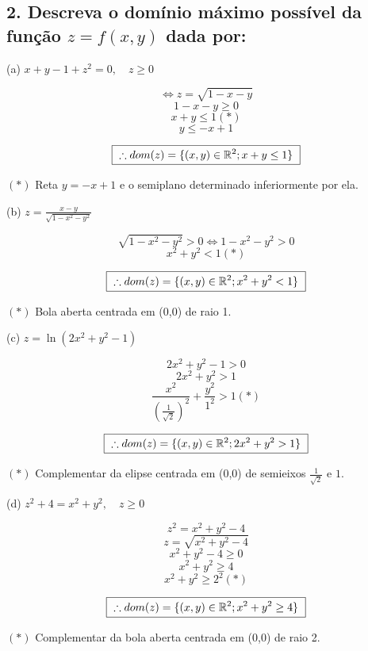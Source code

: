 \documentclass{article}
\newcommand{\n}{\phantom{}}
\renewcommand{\d}[1]{\displaystyle{#1}}
\begin{document}
    \subsection*{2. Descreva o domínio máximo possível da função $z = f(x, y)$ dada por:}
        \hspace*{12px}
        (a) $\d{ x + y - 1 + z^2 = 0, \quad z \geq 0 }$

        \[\Leftrightarrow z = \sqrt{1 - x - y}\]
        \[1 - x - y \geq 0\]
        \[x + y \leq 1 (*)\]
        \[y \leq -x + 1\]

        \[\fbox{ $\d{ \therefore dom(z) = \{(x,y) \in \mathbb{R}^2; x + y \leq 1\} }$ }\]

        $(*)$ Reta $y = -x + 1$ e o semiplano determinado inferiormente por ela.

        \n

        (b) $\d{ z = \frac{x - y}{\sqrt{1 - x^2 - y^2}} }$

        \[\sqrt{1 - x^2 - y^2} > 0 \Leftrightarrow 1 - x^2 - y^2 > 0\]
        \[x^2 + y^2 < 1 (*)\]

        \[\fbox{ $\d{ \therefore dom(z) = \{(x,y) \in \mathbb{R}^2; x^2 + y^2 < 1\} }$ }\]

        $(*)$ Bola aberta centrada em (0,0) de raio 1.

        \n

        (c) $\d{ z = \ln(2x^2 + y^2 - 1) }$

        \[2x^2 + y^2 - 1 > 0\]
        \[2x^2 + y^2 > 1\]
        \[\frac{x^2}{\left(\frac{1}{\sqrt{2}}\right)^2} + \frac{y^2}{1^2} > 1 (*)\]

        \[\fbox{ $\d{ \therefore dom(z) = \{(x,y) \in \mathbb{R}^2; 2x^2 + y^2 > 1\} }$ }\]

        $(*)$ Complementar da elipse centrada em (0,0) de semieixos $\frac{1}{\sqrt{2}}$ e $1$.

        \newpage

        (d) $\d{ z^2 + 4 = x^2 + y^2, \quad z \geq 0 }$

        \[z^2 = x^2 + y^2 - 4\]
        \[z = \sqrt{x^2 + y^2 - 4}\]
        \[x^2 + y^2 - 4 \geq 0\]
        \[x^2 + y^2 \geq 4\]
        \[x^2 + y^2 \geq 2^2 (*)\]

        \[\fbox{ $\d{ \therefore dom(z) = \{(x,y) \in \mathbb{R}^2; x^2 + y ^2 \geq 4\} }$ }\]

        $(*)$ Complementar da bola aberta centrada em (0,0) de raio 2.

        \n
\end{document}
